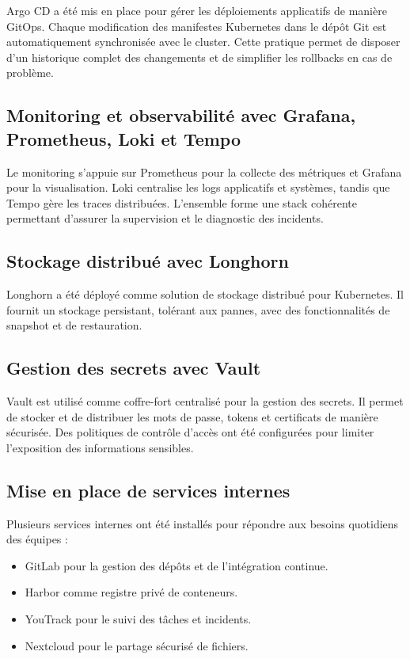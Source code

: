 Argo CD a été mis en place pour gérer les déploiements applicatifs de manière GitOps. Chaque modification des manifestes Kubernetes dans le dépôt Git est automatiquement synchronisée avec le cluster. Cette pratique permet de disposer d’un historique complet des changements et de simplifier les rollbacks en cas de problème.

\subsection{Monitoring et observabilité avec Grafana, Prometheus, Loki et Tempo}

Le monitoring s’appuie sur Prometheus pour la collecte des métriques et Grafana pour la visualisation. Loki centralise les logs applicatifs et systèmes, tandis que Tempo gère les traces distribuées. L’ensemble forme une stack cohérente permettant d’assurer la supervision et le diagnostic des incidents.

\subsection{Stockage distribué avec Longhorn}

Longhorn a été déployé comme solution de stockage distribué pour Kubernetes. Il fournit un stockage persistant, tolérant aux pannes, avec des fonctionnalités de snapshot et de restauration.

\subsection{Gestion des secrets avec Vault}

Vault est utilisé comme coffre-fort centralisé pour la gestion des secrets. Il permet de stocker et de distribuer les mots de passe, tokens et certificats de manière sécurisée. Des politiques de contrôle d’accès ont été configurées pour limiter l’exposition des informations sensibles.

\subsection{Mise en place de services internes}

Plusieurs services internes ont été installés pour répondre aux besoins quotidiens des équipes :

\begin{itemize}
  \item GitLab pour la gestion des dépôts et de l’intégration continue.
  \item Harbor comme registre privé de conteneurs.
  \item YouTrack pour le suivi des tâches et incidents.
  \item Nextcloud pour le partage sécurisé de fichiers.
\end{itemize}

